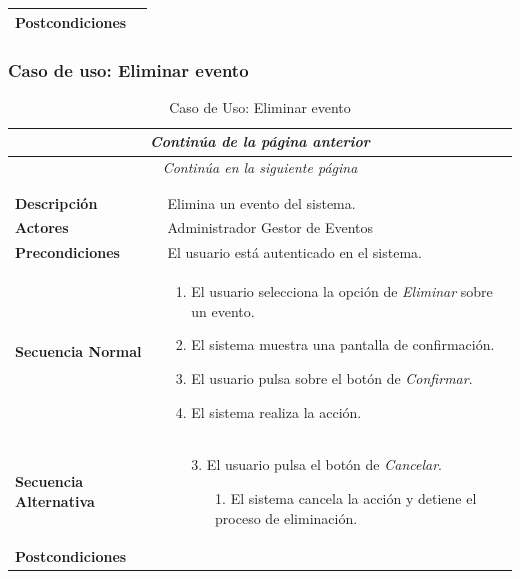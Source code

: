 \begin{longtable}{| p{4cm} | p{10cm} |}
\hline
\textbf{Postcondiciones} & \\
\hline
\end{longtable}



\newpage
\subsubsection*{Caso de uso: Eliminar evento }
\begin{longtable}{| p{4cm} | p{10cm} |}
\endfirsthead
\multicolumn{2}{c}{\textit{Continúa de la página anterior}}\\[12pt]
\hline
\endhead
\hline
\multicolumn{2}{c}{\textit{Continúa en la siguiente página}} \\
\endfoot
\hline
\caption{Caso de Uso: Eliminar evento}\label{fig:1}\\
\endlastfoot


\hline
\multicolumn{2}{|c|}{\textbf{CU$<$40$>$ - Eliminar Evento}} \\

\hline
\textbf{Descripción} &
Elimina un evento del sistema.\\

\hline
\textbf{Actores} &
Administrador\newline
Gestor de Eventos\\

\hline
\textbf{Precondiciones} &
El usuario está autenticado en el sistema.\\

\hline
\textbf{Secuencia Normal} &\mbox{}\par\vspace{-\baselineskip}
\begin{enumerate}[leftmargin=0.7cm, topsep=0.1cm]
\item El usuario selecciona la opción de \textit{Eliminar} sobre un evento.
\item El sistema muestra una pantalla de confirmación.
\item El usuario pulsa sobre el botón de \textit{Confirmar}.
\item El sistema realiza la acción.
\end{enumerate}


\\
\hline
\textbf{Secuencia Alternativa} &\mbox{}\par\vspace{-\baselineskip}
\begin{enumerate}[leftmargin=0.9cm, topsep=0.1cm]
\item[3.] El usuario pulsa el botón de \textit{Cancelar}.
	\begin{itemize}
	\item[1.] El sistema cancela la acción y detiene el proceso de eliminación.
	\end{itemize}
\end{enumerate}
\\

\hline
\textbf{Postcondiciones} & \\
\hline
\end{longtable}



